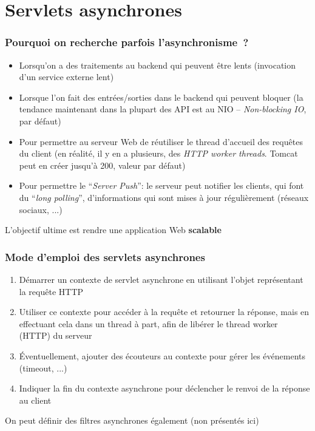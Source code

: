 \documentclass{beamer}
\begin{document}
\section{Servlets asynchrones}
\begin{frame}
	\frametitle{Pourquoi on recherche parfois l'asynchronisme~?}
	\begin{itemize}
		\item Lorsqu'on a des traitements au backend qui peuvent être lents (invocation d'un service externe lent)
		\item Lorsque l'on fait des entrées/sorties dans le backend qui peuvent bloquer (la tendance maintenant dans la plupart des API est au NIO -- \textit{Non-blocking IO}, par défaut)
		\item Pour permettre au serveur Web de réutiliser le thread d'accueil des requêtes du client (en réalité, il y en a plusieurs, des \textit{HTTP worker threads}. Tomcat peut en créer jusqu'à 200, valeur par défaut)
		\item Pour permettre le ``\textit{Server Push}'': le serveur peut notifier les clients, qui font du ``\textit{long polling}'', d'informations qui sont mises à jour régulièrement (réseaux sociaux, ...)
	\end{itemize}
L'objectif ultime est rendre une application Web \textbf{scalable}
\end{frame}

\begin{frame}
	\frametitle{Mode d'emploi des servlets asynchrones}
	\begin{enumerate}
		\item Démarrer un contexte de servlet asynchrone en utilisant l'objet représentant la requête HTTP
		\item Utiliser ce contexte pour accéder à la requête et retourner la réponse, mais en effectuant cela dans un thread à part,  afin de libérer le thread worker (HTTP) du serveur
		\item Éventuellement, ajouter des écouteurs au contexte pour gérer les événements (timeout, ...)
		\item Indiquer la fin du contexte asynchrone pour déclencher le renvoi de la réponse au client
	\end{enumerate}
On peut définir des filtres asynchrones également (non présentés ici)
\end{frame}
\end{document}
